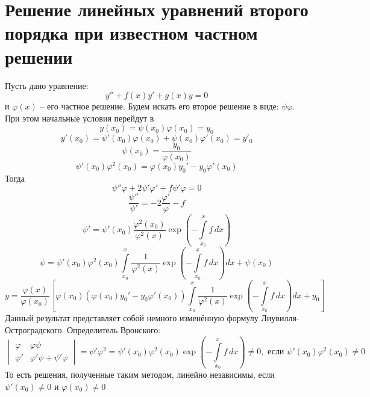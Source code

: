 \section{Решение линейных уравнений второго порядка при известном частном решении}

Пусть дано уравнение:
\[
	y'' + f(x) y' + g(x) y = 0
\]
и $\varphi(x)$ -- его частное решение. Будем искать его второе решение в виде: $\psi \varphi$. При этом начальные условия перейдут в
\[
	y(x_0) = \psi (x_0)\varphi(x_0) = y_0
\] 
\[
	y'(x_0) = \psi' (x_0) \varphi (x_0) + \psi (x_0) \varphi' (x_0) = y'_0
\]
\[
	\psi (x_0) = \frac{y_0}{\varphi(x_0)}
\]
\[
	\psi' (x_0) \varphi^2 (x_0) = \varphi (x_0) y_0' - y_0 \varphi' (x_0)
\]
Тогда
\[
	\psi'' \varphi + 2 \psi' \varphi' + f \psi' \varphi = 0
\]
\[
	\frac{\psi''}{\psi'} = - 2 \frac{\varphi'}{\varphi} - f
\]
\[
	\psi' = \psi'(x_0) \frac{\varphi^2(x_0)}{\varphi^2(x)} \exp \left( - \int\limits_{x_0}^{x} f\,dx\right)
\]
\[
	\psi = \psi' (x_0) \varphi^2 (x_0) \int\limits_{x_0}^{x} \frac{1}{\varphi^2(x)} \exp \left( - \int\limits_{x_0}^{x} f\,dx\right) dx + \psi (x_0)
\]
\[
	y = \frac{\varphi(x)}{\varphi(x_0)} \left[\varphi (x_0) ( \varphi (x_0) y_0' - y_0 \varphi' (x_0)) \int\limits_{x_0}^{x} \frac{1}{\varphi^2(x)} \exp \left( - \int\limits_{x_0}^{x} f\,dx\right) dx + y_0 \right]
\]
Данный результат представляет собой немного изменённую формулу Лиувилля-Остроградского.
Определитель Вронского:
\[
	\begin{vmatrix}
		\varphi & \varphi \psi \\
		\varphi' & \varphi' \psi + \psi' \varphi
	\end{vmatrix} = \psi' \varphi^2 = 
	\psi'(x_0) \varphi^2(x_0) \exp \left( - \int\limits_{x_0}^{x} f\,dx\right) \ne 0, \text{ если } \psi'(x_0) \varphi^2(x_0) \ne 0
\]
То есть решения, полученные таким методом, линейно независимы, если $\psi'(x_0)\ne 0$ и $\varphi(x_0) \ne 0$